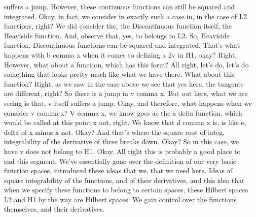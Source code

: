 \documentclass[10pt]{article}
\begin{document}
suffers a jump. However, these continuous functions can still be squared and integrated. Okay, in fact, we consider in exactly such a case in, in the case of L2 functions, right? We did consider the, the Discontinuous function itself, the Heaviside function. And, observe that, yes, to belongs to L2. So, Heaviside function, Discontinuous functions can be squared and integrated. That's what happens with b comma x when it comes to defining a 2v in H1, okay? Right. However, what about a function, which has this form? All right, let's do, let's do something that looks pretty much like what we have there. What about this function? Right, as we saw in the case above we see that yes here, the tangents are different, right? So there is a jump in v comma x. But out here, what we are seeing is that, v itself suffers a jump. Okay, and therefore, what happens when we consider v comma x? V comma x, we know goes as the a delta function, which would be called at this point x not, right. We know that d comma x is, is like e, delta of x minus x not. Okay? And that's where the square root of integ, integrability of the derivative of three breaks down. Okay? So in this case, we have v does not belong to H1. Okay. All right this is probably a good place to end this segment. We've essentially gone over the definition of our very basic function spaces, introduced these ideas that we, that we need here. Ideas of square integrability of the functions, and of their derivatives, and this idea that when we specify these functions to belong to certain spaces, these Hilbert spaces L2 and H1 by the way are Hilbert spaces. We gain control over the functions themselves, and their derivatives.
\end{document}
